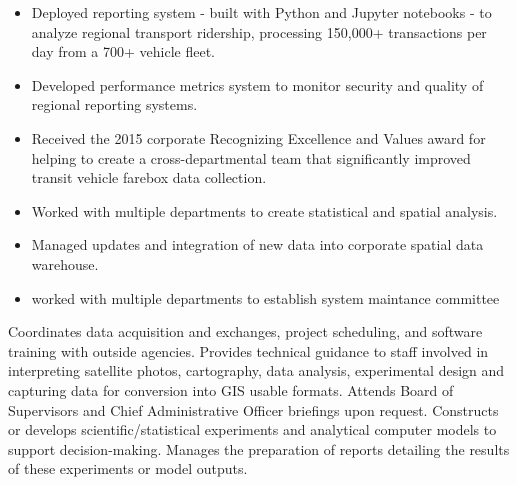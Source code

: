 \documentclass[letterpaper]{article}
\newenvironment{jobtasklist}
        {
            \vspace{-12pt}
            \begin{itemize} \itemsep 0pt
        }{
            \end{itemize}
            \vspace{-3pt}
        }
\begin{document}
\begin{jobtasklist}
    \item Deployed reporting system - built with Python and Jupyter notebooks -
        to analyze regional transport ridership, processing 150,000+
        transactions per day from a 700+ vehicle fleet.

    \item Developed performance metrics system to monitor security and quality
        of regional reporting systems.

    \item Received the 2015 corporate Recognizing Excellence and Values award
        for helping to create a cross-departmental team that significantly
        improved transit vehicle farebox data collection.

    \item Worked with multiple departments to create statistical and spatial analysis.

    \item Managed updates and integration of new data into corporate spatial data warehouse.

    \item worked with multiple departments to establish system maintance committee


\end{jobtasklist}

Coordinates data acquisition and exchanges, project scheduling, and software training with outside agencies.
Provides technical guidance to staff involved in interpreting satellite photos,
cartography, data analysis, experimental design and capturing data for
conversion into GIS usable formats.
Attends Board of Supervisors and Chief Administrative Officer briefings upon request.
Constructs or develops scientific/statistical experiments and analytical computer models to support decision-making.
Manages the preparation of reports detailing the results of these experiments or model outputs.
\end{document}
